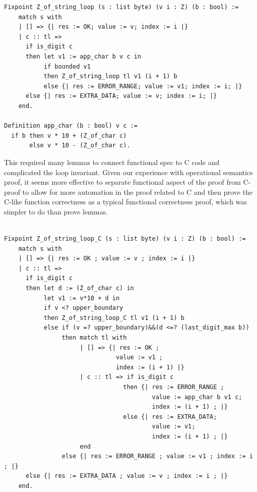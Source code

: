 \documentclass[acmsmall,nonacm]{acmart}
\begin{document}
 \begin{lstlisting}[language=Coq]
Fixpoint Z_of_string_loop (s : list byte) (v i : Z) (b : bool) := 
    match s with 
    | [] => {| res := OK; value := v; index := i |}
    | c :: tl => 
      if is_digit c
      then let v1 := app_char b v c in 
           if bounded v1
           then Z_of_string_loop tl v1 (i + 1) b
           else {| res := ERROR_RANGE; value := v1; index := i; |}      
      else {| res := EXTRA_DATA; value := v; index := i; |}              
    end.

Definition app_char (b : bool) v c := 
  if b then v * 10 + (Z_of_char c) 
       else v * 10 - (Z_of_char c).
 \end{lstlisting}

This required many lemmas to connect functional spec to C code and complicated the loop invariant. Given our experience with operational semantics proof, it seems more effective to separate functional aspect of the proof from C-proof to allow for more automation in the proof related to C and then prove the C-like function correctness as a typical functional correctness proof, which was simpler to do than prove lemmas.

 \begin{lstlisting}[language=Coq]
 
Fixpoint Z_of_string_loop_C (s : list byte) (v i : Z) (b : bool) := 
    match s with 
    | [] => {| res := OK ; value := v ; index := i |}
    | c :: tl => 
      if is_digit c
      then let d := (Z_of_char c) in 
           let v1 := v*10 + d in
           if v <? upper_boundary 
           then Z_of_string_loop_C tl v1 (i + 1) b
           else if (v =? upper_boundary)&&(d <=? (last_digit_max b))
                then match tl with
                     | [] => {| res := OK ; 
                               value := v1 ; 
                               index := (i + 1) |}
                     | c :: tl => if is_digit c
                                 then {| res := ERROR_RANGE ;
                                         value := app_char b v1 c;
                                         index := (i + 1) ; |}
                                 else {| res := EXTRA_DATA;
                                         value := v1;
                                         index := (i + 1) ; |}
                     end
                else {| res := ERROR_RANGE ; value := v1 ; index := i ; |}      
      else {| res := EXTRA_DATA ; value := v ; index := i ; |}              
    end.
    
 \end{lstlisting}
\end{document}
